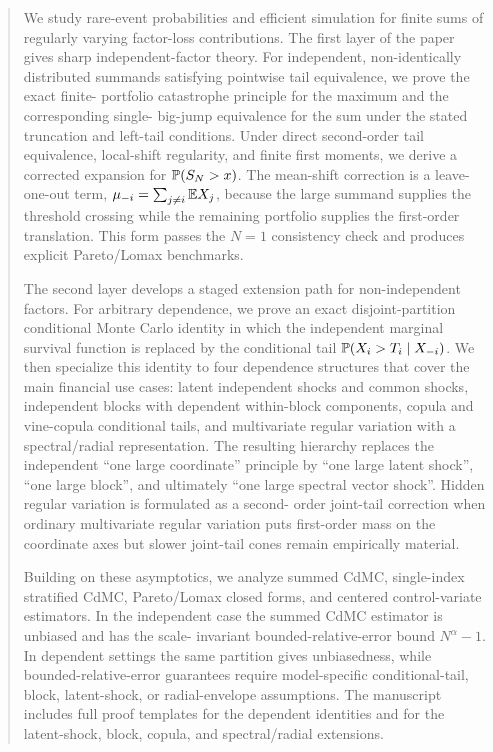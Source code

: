 \begin{abstract}
\noindent
We study rare-event probabilities and efficient simulation for finite sums of
regularly varying factor-loss contributions. The first layer of the paper gives
sharp independent-factor theory. For independent, non-identically distributed
summands satisfying pointwise tail equivalence, we prove the exact finite-
portfolio catastrophe principle for the maximum and the corresponding single-
big-jump equivalence for the sum under the stated truncation and left-tail
conditions. Under direct second-order tail equivalence, local-shift regularity,
and finite first moments, we derive a corrected expansion for
$\Pb(S_N>x)$. The mean-shift correction is a leave-one-out term,
$\mu_{-i}=\sum_{j\ne i}\E X_j$, because the large summand supplies the
threshold crossing while the remaining portfolio supplies the first-order
translation. This form passes the $N=1$ consistency check and produces explicit
Pareto/Lomax benchmarks.

The second layer develops a staged extension path for non-independent factors.
For arbitrary dependence, we prove an exact disjoint-partition conditional Monte
Carlo identity in which the independent marginal survival function is replaced
by the conditional tail $\Pb(X_i>T_i\mid X_{-i})$. We then specialize this
identity to four dependence structures that cover the main financial use cases:
latent independent shocks and common shocks, independent blocks with dependent
within-block components, copula and vine-copula conditional tails, and
multivariate regular variation with a spectral/radial representation. The
resulting hierarchy replaces the independent ``one large coordinate'' principle
by ``one large latent shock'', ``one large block'', and ultimately ``one large
spectral vector shock''. Hidden regular variation is formulated as a second-
order joint-tail correction when ordinary multivariate regular variation puts
first-order mass on the coordinate axes but slower joint-tail cones remain
empirically material.

Building on these asymptotics, we analyze summed CdMC, single-index stratified
CdMC, Pareto/Lomax closed forms, and centered control-variate estimators. In
the independent case the summed CdMC estimator is unbiased and has the scale-
invariant bounded-relative-error bound $N^\alpha-1$. In dependent settings the
same partition gives unbiasedness, while bounded-relative-error guarantees
require model-specific conditional-tail, block, latent-shock, or radial-envelope
assumptions. The manuscript includes full proof templates for the dependent
identities and for the latent-shock, block, copula, and spectral/radial
extensions.


\end{abstract}
